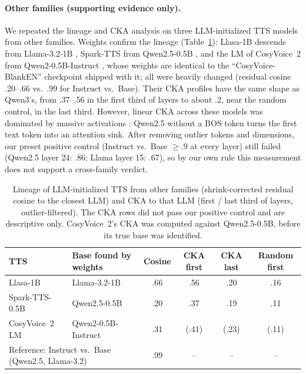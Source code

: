 \documentclass[11pt]{article}
\begin{document}
\paragraph{Other families (supporting evidence only).} We repeated the lineage and CKA analysis on three LLM-initialized TTS models from other families. Weights confirm the lineage (Table~\ref{tab:families}): Llasa-1B descends from Llama-3.2-1B \citep{llama3}, Spark-TTS from Qwen2.5-0.5B \citep{qwen25}, and the LM of CosyVoice~2 from Qwen2-0.5B-Instruct \citep{qwen2}, whose weights are identical to the ``CosyVoice-BlankEN'' checkpoint shipped with it; all were heavily changed (residual cosine .20--.66 vs.\ .99 for Instruct vs.\ Base). Their CKA profiles have the same shape as Qwen3's, from .37--.56 in the first third of layers to about .2, near the random control, in the last third. However, linear CKA across these models was dominated by massive activations \citep{sun2024massive}: Qwen2.5 without a BOS token turns the first text token into an attention sink. After removing outlier tokens and dimensions, our preset positive control (Instruct vs.\ Base $\geq$.9 at every layer) still failed (Qwen2.5 layer 24: .86; Llama layer 15: .67), so by our own rule this measurement does not support a cross-family verdict.

\begin{table}[t]
  \centering\small
  \caption{Lineage of LLM-initialized TTS from other families (shrink-corrected residual cosine to the closest LLM) and CKA to that LLM (first / last third of layers, outlier-filtered). The CKA rows did not pass our positive control and are descriptive only. CosyVoice~2's CKA was computed against Qwen2.5-0.5B, before its true base was identified.}
  \label{tab:families}
  \begin{tabular}{llcccc}
    \toprule
    TTS & Base found by weights & Cosine & CKA first & CKA last & Random first \\
    \midrule
    Llasa-1B & Llama-3.2-1B & .66 & .56 & .20 & .16 \\
    Spark-TTS-0.5B & Qwen2.5-0.5B & .20 & .37 & .19 & .11 \\
    CosyVoice~2 LM & Qwen2-0.5B-Instruct & .31 & (.41) & (.23) & (.11) \\
    \midrule
    \multicolumn{2}{l}{Reference: Instruct vs.\ Base (Qwen2.5, Llama-3.2)} & .99 & -- & -- & -- \\
    \bottomrule
  \end{tabular}
\end{table}
\end{document}
